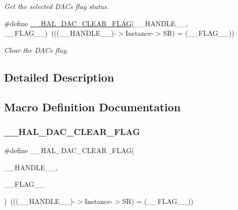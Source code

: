 \begin{DoxyCompactItemize}
\begin{DoxyCompactList}\small\item\em Get the selected D\+AC\textquotesingle{}s flag status. \end{DoxyCompactList}\item 
\#define \mbox{\hyperlink{group___d_a_c___exported___macros_ga79f5a87ffeb8dc2a34a1d47154ac031b}{\+\_\+\+\_\+\+H\+A\+L\+\_\+\+D\+A\+C\+\_\+\+C\+L\+E\+A\+R\+\_\+\+F\+L\+AG}}(\+\_\+\+\_\+\+H\+A\+N\+D\+L\+E\+\_\+\+\_\+,  \+\_\+\+\_\+\+F\+L\+A\+G\+\_\+\+\_\+)~(((\+\_\+\+\_\+\+H\+A\+N\+D\+L\+E\+\_\+\+\_\+)-\/$>$Instance-\/$>$SR) = (\+\_\+\+\_\+\+F\+L\+A\+G\+\_\+\+\_\+))
\begin{DoxyCompactList}\small\item\em Clear the D\+AC\textquotesingle{}s flag. \end{DoxyCompactList}\end{DoxyCompactItemize}


\subsection{Detailed Description}


\subsection{Macro Definition Documentation}
\mbox{\label{group___d_a_c___exported___macros_ga79f5a87ffeb8dc2a34a1d47154ac031b}} 
\subsubsection{\texorpdfstring{\_\_HAL\_DAC\_CLEAR\_FLAG}{\_\_HAL\_DAC\_CLEAR\_FLAG}}
{\footnotesize\ttfamily \#define \+\_\+\+\_\+\+H\+A\+L\+\_\+\+D\+A\+C\+\_\+\+C\+L\+E\+A\+R\+\_\+\+F\+L\+AG(\begin{DoxyParamCaption}\item[{}]{\+\_\+\+\_\+\+H\+A\+N\+D\+L\+E\+\_\+\+\_\+,  }\item[{}]{\+\_\+\+\_\+\+F\+L\+A\+G\+\_\+\+\_\+ }\end{DoxyParamCaption})~(((\+\_\+\+\_\+\+H\+A\+N\+D\+L\+E\+\_\+\+\_\+)-\/$>$Instance-\/$>$SR) = (\+\_\+\+\_\+\+F\+L\+A\+G\+\_\+\+\_\+))}



